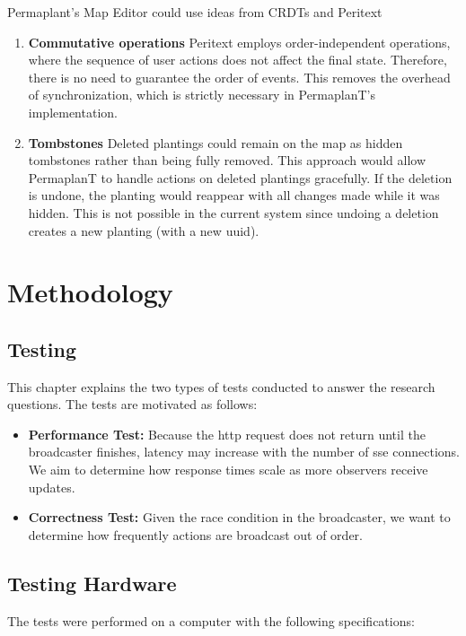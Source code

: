 \documentclass[final,oneside]{vutinfth}
\begin{document}
Permaplant's Map Editor could use ideas from CRDTs and Peritext
\begin{enumerate}
    \item \textbf{Commutative operations} Peritext employs order-independent operations, where the sequence of user actions does not affect the final state.
    Therefore, there is no need to guarantee the order of events.
    This removes the overhead of synchronization, which is strictly necessary in PermaplanT's implementation.
    \item \textbf{Tombstones} Deleted plantings could remain on the map as hidden tombstones rather than being fully removed.
    This approach would allow PermaplanT to handle actions on deleted plantings gracefully.
    If the deletion is undone, the planting would reappear with all changes made while it was hidden.
    This is not possible in the current system since undoing a deletion creates a new planting (with a new \gls{uuid}).
\end{enumerate}

\chapter{Methodology}\label{chap:methodology}

\section{Testing}

This chapter explains the two types of tests conducted to answer the research questions.
The tests are motivated as follows:
\begin{itemize}
    \item \textbf{Performance Test:} Because the \gls{http} request does not return until the broadcaster finishes, latency may increase with the number of \gls{sse} connections.
    We aim to determine how response times scale as more observers receive updates.
    \item \textbf{Correctness Test:} Given the race condition in the broadcaster, we want to determine how frequently actions are broadcast out of order.
\end{itemize}

\section{Testing Hardware}

The tests were performed on a computer with the following specifications:
\end{document}
